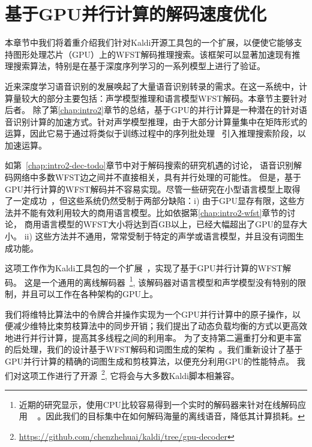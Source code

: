 
\chapter{基于GPU并行计算的解码速度优化}
\label{chap:gpu}

本章节中我们将着重介绍我们针对Kaldi开源工具包的一个扩展，以便使它能够支持图形处理芯片（GPU）上的WFST解码推理搜索。该框架可以显著加速现有推理搜索算法，特别是在基于深度序列学习的一系列模型上进行了验证。


近来深度学习语音识别的发展唤起了大量语音识别转录的需求。在这一系统中，计算量较大的部分主要包括：声学模型推理和语言模型WFST解码。本章节主要针对后者。
除了第\ref{chap:intro2}章节的总结，基于GPU的并行计算是一种潜在的针对语音识别计算的加速方式。针对声学模型推理，由于大部分计算量集中在矩阵形式的运算，因此它易于通过将类似于训练过程中\cite{vesely2010parallel}的序列批处理~\cite{dixon2009harnessing} 引入推理搜索阶段，以加速运算。

如第~\ref{chap:intro2-dec-todo}章节中对于解码搜索的研究机遇的讨论，
语音识别解码网络中多数WFST边之间并不直接相关，具有并行处理的可能性。
但是，基于GPU并行计算的WFST解码并不容易实现。尽管一些研究在小型语言模型上取得了一定成功~\cite{you2009parallel}，但这些系统仍然受制于两部分缺陷：i) 由于GPU显存有限，这些方法并不能有效利用较大的商用语言模型。比如依据第\ref{chap:intro2-wfst}章节的讨论， 商用语言模型的WFST大小将达到百GB以上，已经大幅超出了GPU的显存大小。
ii) 这些方法并不通用，常常受制于特定的声学或语言模型，并且没有词图生成功能。



这项工作作为Kaldi工具包的一个扩展~\cite{povey2011kaldi}，实现了基于GPU并行计算的WFST解码。
%
这是一个通用的离线解码器~\footnote{近期的研究显示，使用CPU比较容易得到一个实时的解码器来针对在线解码应用
 ~\cite{peddinti2018low,zhc00-chen-tasl2017} 。因此我们的目标集中在如何解码海量的离线语音，降低其计算损耗。},
 该解码器对语言模型和声学模型没有特别的限制，并且可以工作在各种架构的GPU上。
%

我们将维特比算法中的令牌合并操作实现为一个GPU并行计算中的原子操作，以便减少维特比束剪枝算法中的同步开销；我们提出了动态负载均衡的方式以更高效地进行并行计算，提高其多线程之间的利用率。
为了支持第二遍重打分和更丰富的后处理，我们的设计基于WFST解码和词图生成的架构~\cite{povey2012generating}。我们重新设计了基于GPU并行计算的精确的词图生成和剪枝算法，以便充分利用GPU的性能特点。
%
我们对这项工作进行了开源~\footnote{\url{https://github.com/chenzhehuai/kaldi/tree/gpu-decoder}},
它将会与大多数Kaldi脚本相兼容。



